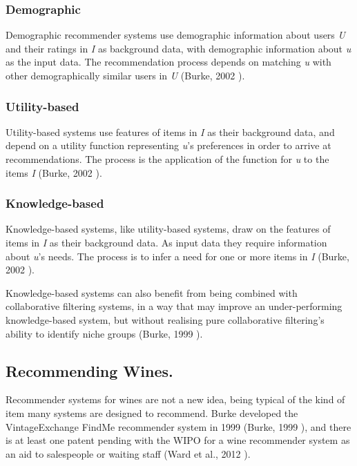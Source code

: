 \subsubsection{Demographic}

Demographic recommender systems use demographic information about users \textit{U} and their ratings in \textit{I} as background data, with demographic information about \textit{u} as the input data. The recommendation process depends on matching \textit{u} with other demographically similar users in \textit{U} (Burke, 2002 \cite{Burke02}).

\subsubsection{Utility-based}

Utility-based systems use features of items in \textit{I} as their background data, and depend on a utility function representing \textit{u}'s preferences in order to arrive at recommendations. The process is the application of the function for \textit{u} to the items \textit{I} (Burke, 2002 \cite{Burke02}).

\subsubsection{Knowledge-based}

Knowledge-based systems, like utility-based systems, draw on the features of items in \textit{I} as their background data. As input data they require information about \textit{u}'s needs. The process is to infer a need for one or more items in \textit{I} (Burke, 2002 \cite{Burke02}).

Knowledge-based systems can also benefit from being combined with collaborative filtering systems, in a way that may improve an under-performing knowledge-based system, but without realising pure collaborative filtering's ability to identify niche groups (Burke, 1999 \cite{Burke99b}).

\subsection{Recommending Wines.}

Recommender systems for wines are not a new idea, being typical of the kind of item many systems are designed to recommend. Burke developed the VintageExchange FindMe recommender system in 1999 (Burke, 1999 \cite{Burke99}), and there is at least one patent pending with the WIPO for a wine recommender system as an aid to salespeople or waiting staff (Ward et al., 2012 \cite{WIPO12}).

